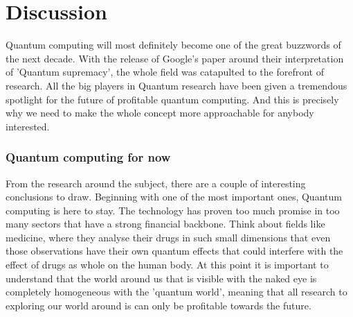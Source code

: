 
\chapter{Discussion}
\label{ch:conclusie}

Quantum computing will most definitely become one of the great buzzwords of the next decade. With the release of Google's paper around their interpretation of 'Quantum supremacy', the whole field was catapulted to the forefront of research. All the big players in Quantum research have been given a tremendous spotlight for the future of profitable quantum computing. And this is precisely why we need to make the whole concept more approachable for anybody interested.

\subsection{Quantum computing for now}

From the research around the subject, there are a couple of interesting conclusions to draw. Beginning with one of the most important ones, Quantum computing is here to stay. The technology has proven too much promise in too many sectors that have a strong financial backbone. Think about fields like medicine, where they analyse their drugs in such small dimensions that even those observations have their own quantum effects that could interfere with the effect of drugs as whole on the human body. At this point it is important to understand that the world around us that is visible with the naked eye is completely homogeneous with the 'quantum world', meaning that all research to exploring our world around is can only be profitable towards the future.

